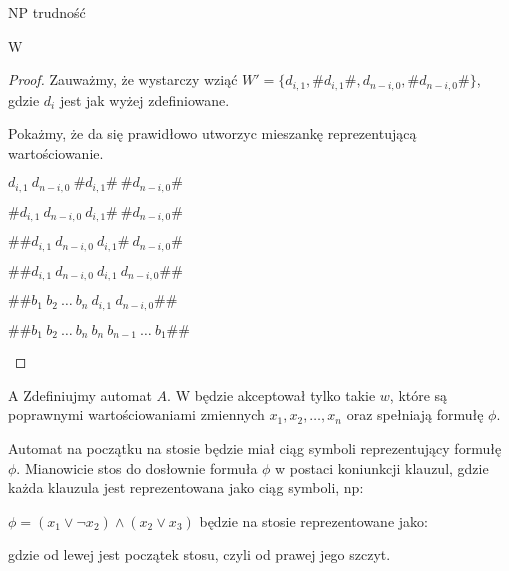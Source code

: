 \documentclass{article}
\theoremstyle{definition}
\theoremstyle{remark}
\begin{document}
\begin{section}{NP trudność}
\begin{subsection}{W}
\begin{proof}
Zauważmy, że wystarczy wziąć $W' = \{ d_{i,1}, \#d_{i,1}\#, d_{n-i, 0}, \# d_{n-i, 0} \# \}$, gdzie $d_i$ jest jak wyżej zdefiniowane.

Pokażmy, że da się prawidłowo utworzyc mieszankę reprezentującą wartościowanie.

\begin{center}
    $d_{i,1} \ d_{n-i, 0} \ \#d_{i,1}\# \ \# d_{n-i, 0} \#$
    
    $ \# d_{i,1} \ d_{n-i, 0} \ d_{i,1}\# \ \# d_{n-i, 0} \#$

    $ \# \# d_{i,1} \ d_{n-i, 0} \ d_{i,1}\# \ d_{n-i, 0} \#$

    $ \# \# d_{i,1} \ d_{n-i, 0} \ d_{i,1} \ d_{n-i, 0} \#\#$

    $\# \# b_1 \ b_2 \ \ldots \ b_n \ d_{i,1} \ d_{n-i, 0} \#\#$

    $\# \# b_1 \ b_2 \ \ldots \ b_n \ b_n \ b_{n-1} \ \ldots \ b_1 \#\#$
\end{center}

\end{proof}

\end{subsection}

\begin{subsection}{A}
Zdefiniujmy automat $A$. W będzie akceptował tylko takie $w$, które są poprawnymi wartościowaniami zmiennych $x_1, x_2, \ldots, x_n$ 
oraz spełniają formułę $\phi$.

Automat na początku na stosie będzie miał ciąg symboli reprezentujący formułę $\phi$.
Mianowicie stos do dosłownie formuła $\phi$ w postaci koniunkcji klauzul, gdzie każda klauzula jest reprezentowana jako ciąg symboli, np:

$ \phi = (x_1 \lor \neg x_2) \land (x_2 \lor x_3)$ będzie na stosie reprezentowane jako:


gdzie od lewej jest początek stosu, czyli od prawej jego szczyt.
\end{subsection}

\end{section}
\end{document}
